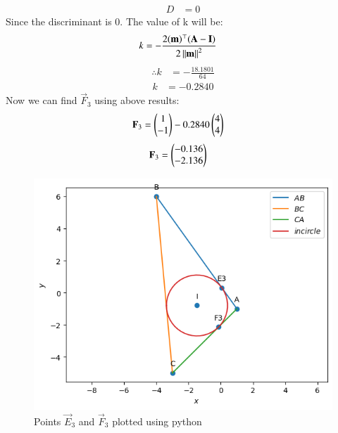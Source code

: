 \documentclass[journal,12pt,twocolumn]{IEEEtran}
\theoremstyle{remark}
\begin{document}
\begin{enumerate}
\begin{align}
D &= 0
\end{align}
Since the discriminant is $0$. The value of k will be:
\begin{align}
k &= -\frac{2(\mathbf{m})^\top(\mathbf{A-I})}{2\left\lVert\mathbf{m}\right\rVert^2}
\end{align}
\begin{align}
\therefore k &= -\frac{18.1801}{64}
\end{align}
\begin{align}
k &= -0.2840
\end{align}
Now we can find $\vec{F}_3$ using above results:
\begin{align}
\mathbf{F}_3 &=\begin{pmatrix}1\\-1\end{pmatrix}-0.2840\begin{pmatrix}4\\4\end{pmatrix}
\end{align}
\begin{align}
\mathbf{F}_3 &= \begin{pmatrix}-0.136\\-2.136\end{pmatrix}
\end{align}
\end{enumerate}
\begin{figure}[H]
\includegraphics[width=\columnwidth]{figs/Incentre.png}
\caption{Points $\vec{E}_3$ and $\vec{F}_3$ plotted using python}
\label{fig:i_tri_py}
\end{figure}
\end{document}
